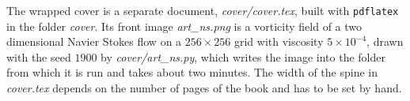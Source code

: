 The wrapped cover is a separate document, \textit{cover/cover.tex}, built with \texttt{pdflatex} in the folder \textit{cover}. Its front image \textit{art\_ns.png} is a vorticity field of a two dimensional Navier Stokes flow on a $256\times256$ grid with viscosity $5\times10^{-4}$, drawn with the seed $1900$ by \textit{cover/art\_ns.py}, which writes the image into the folder from which it is run and takes about two minutes. The width of the spine in \textit{cover.tex} depends on the number of pages of the book and has to be set by hand.
